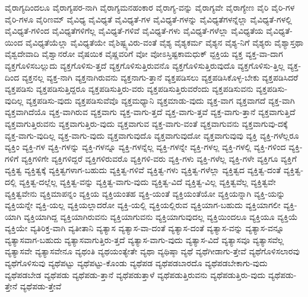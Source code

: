{ವೈರಾಗ್ಯದಿಂದಲೂ
ವೈರಾಗ್ಯಪರ-ನಾಗಿ
ವೈರಾಗ್ಯಮನಹಂಕಾರ
ವೈರಾಗ್ಯ-ವನ್ನು
ವೈರಾಗ್ಯವೇ
ವೈರಾಗ್ಯೇಣ
ವೈರಿ
ವೈರಿ-ಗಳ
ವೈರಿ-ಗಳೂ
ವೈರಿಣಮ್
ವೈವಿಧ್ಯ
ವೈವಿಧ್ಯತೆ
ವೈವಿಧ್ಯತೆ-ಗಳ
ವೈವಿಧ್ಯತೆ-ಗಳನ್ನು
ವೈವಿಧ್ಯತೆಗಳನ್ನೆಲ್ಲಾ
ವೈವಿಧ್ಯತೆ-ಗಳಲ್ಲಿ
ವೈವಿಧ್ಯತೆ-ಗಳಿಂದ
ವೈವಿಧ್ಯತೆಗಳಿಗೆಲ್ಲ
ವೈವಿಧ್ಯತೆ-ಗಳಿವೆ
ವೈವಿಧ್ಯತೆ-ಗಳು
ವೈವಿಧ್ಯತೆ-ಗಳೆಲ್ಲಾ
ವೈವಿಧ್ಯತೆಯ
ವೈವಿಧ್ಯತೆ-ಯಿಂದ
ವೈವಿಧ್ಯತೆಯೆಲ್ಲಾ
ವೈವಿಧ್ಯತೆಯೇ
ವೈಶಿಷ್ಟ್ಯವಿರು-ವಂತೆ
ವೈಶ್ಯ
ವೈಶ್ಯಕರ್ಮ
ವೈಶ್ಯನ
ವೈಶ್ಯ-ನಿಗೆ
ವೈಶ್ಯರು
ವೈಶ್ಯಾಸ್ತಥಾ
ವೈಶ್ವದೇವಾದಿ
ವೈಶ್ವಾನರೋ
ವೈಷಯಿಕ
ವೈಷ್ಣವರಿಗೆ
ವೋ
ವೋಽಸ್ತಿಷ್ಟಕಾಮಧುಕ್
ವ್ಟಕ್ತಿಯ
ವ್ಯಕ್ತ
ವ್ಯಕ್ತ-ವಾ-ದಾಗ
ವ್ಯಕ್ತಗೊಳಿಸಬಲ್ಲುದು
ವ್ಯಕ್ತಗೊಳಿಸು-ತ್ತದೆ
ವ್ಯಕ್ತಗೊಳಿಸುತ್ತಿರುವನೊ
ವ್ಯಕ್ತಗೊಳಿಸುತ್ತಿರುವುದೊ
ವ್ಯಕ್ತಗೊಳಿಸು-ತ್ತಿಲ್ಲ
ವ್ಯಕ್ತ-ದಿಂದ
ವ್ಯಕ್ತನಲ್ಲ
ವ್ಯಕ್ತ-ನಾಗಿ
ವ್ಯಕ್ತನಾಗಿರುವನು
ವ್ಯಕ್ತನಾಗು-ತ್ತಾನೆ
ವ್ಯಕ್ತಪಡಿಸಲು
ವ್ಯಕ್ತಪಡಿಸಿಕೊಳ್ಳ-ಬೇಕು
ವ್ಯಕ್ತಪಡಿಸಿದರೆ
ವ್ಯಕ್ತಪಡಿಸು
ವ್ಯಕ್ತಪಡಿಸುತ್ತಿದ್ದರೂ
ವ್ಯಕ್ತಪಡಿಸುತ್ತಿರು-ವರು
ವ್ಯಕ್ತಪಡಿಸುತ್ತಿರುವರೆಂದು
ವ್ಯಕ್ತಪಡಿಸುವನು
ವ್ಯಕ್ತಪಡಿಸು-ವುದಿಲ್ಲ
ವ್ಯಕ್ತಪಡಿಸು-ವುದು
ವ್ಯಕ್ತಪಡಿಸುವೆವೊ
ವ್ಯಕ್ತಮಧ್ಯಾನಿ
ವ್ಯಕ್ತಮಾಡು-ವುದು
ವ್ಯಕ್ತ-ವಾಗ
ವ್ಯಕ್ತವಾಗದೆ
ವ್ಯಕ್ತ-ವಾಗಿ
ವ್ಯಕ್ತವಾಗಿದೆಯೊ
ವ್ಯಕ್ತ-ವಾಗಿರುವ
ವ್ಯಕ್ತವಾಗು
ವ್ಯಕ್ತ-ವಾಗು-ತ್ತದೆ
ವ್ಯಕ್ತ-ವಾಗು-ತ್ತವೆ
ವ್ಯಕ್ತ-ವಾಗು-ತ್ತಾನೆ
ವ್ಯಕ್ತವಾಗುತ್ತಿದೆ
ವ್ಯಕ್ತವಾಗುತ್ತಿರುವನು
ವ್ಯಕ್ತವಾಗುತ್ತಿರು-ವುದು
ವ್ಯಕ್ತವಾಗುವ
ವ್ಯಕ್ತ-ವಾಗು-ವಂತೆ
ವ್ಯಕ್ತವಾಗುವನು
ವ್ಯಕ್ತವಾಗುವು-ದಕ್ಕೆ
ವ್ಯಕ್ತ-ವಾಗು-ವುದಿಲ್ಲ
ವ್ಯಕ್ತ-ವಾಗು-ವುದು
ವ್ಯಕ್ತವಾಗುವುದೊ
ವ್ಯಕ್ತವಾಗುವುದೋ
ವ್ಯಕ್ತವಾಗುವುವು
ವ್ಯಕ್ತಿ
ವ್ಯಕ್ತಿ-ಗಳೆಲ್ಲರೂ
ವ್ಯಕ್ತಿಂ
ವ್ಯಕ್ತಿ-ಗಳ
ವ್ಯಕ್ತಿ-ಗಳನ್ನು
ವ್ಯಕ್ತಿ-ಗಳನ್ನೂ
ವ್ಯಕ್ತಿ-ಗಳನ್ನೆಲ್ಲ
ವ್ಯಕ್ತಿ-ಗಳನ್ನೇ
ವ್ಯಕ್ತಿ-ಗಳಲ್ಲ
ವ್ಯಕ್ತಿ-ಗಳಲ್ಲಿ
ವ್ಯಕ್ತಿ-ಗಳಿಂದ
ವ್ಯಕ್ತಿ-ಗಳಿಗೆ
ವ್ಯಕ್ತಿಗಳಿಗೇ
ವ್ಯಕ್ತಿಗಳಿದ್ದರೆ
ವ್ಯಕ್ತಿಗಳಿರುವರೊ
ವ್ಯಕ್ತಿಗಳಿ-ವರು
ವ್ಯಕ್ತಿ-ಗಳು
ವ್ಯಕ್ತಿ-ಗಳೆಲ್ಲ
ವ್ಯಕ್ತಿ-ಗಳೇ
ವ್ಯಕ್ತಿಗೂ
ವ್ಯಕ್ತಿಗೆ
ವ್ಯಕ್ತಿತ್ವ
ವ್ಯಕ್ತಿತ್ವಕ್ಕೆ
ವ್ಯಕ್ತಿತ್ವಗಳಾಗ-ಬಹುದು
ವ್ಯಕ್ತಿತ್ವ-ಗಳಿವೆ
ವ್ಯಕ್ತಿತ್ವ-ಗಳು
ವ್ಯಕ್ತಿತ್ವ-ಗಳೆಲ್ಲಾ
ವ್ಯಕ್ತಿತ್ವದ
ವ್ಯಕ್ತಿತ್ವ-ದಂತೆ
ವ್ಯಕ್ತಿತ್ವ-ದಲ್ಲಿ
ವ್ಯಕ್ತಿತ್ವ-ದಲ್ಲೆಲ್ಲ
ವ್ಯಕ್ತಿತ್ವ-ವನ್ನು
ವ್ಯಕ್ತಿತ್ವ-ವಾಗು-ವುದು
ವ್ಯಕ್ತಿತ್ವ-ವಿದೆ
ವ್ಯಕ್ತಿತ್ವ-ವಿಲ್ಲ
ವ್ಯಕ್ತಿತ್ವವೆಲ್ಲ
ವ್ಯಕ್ತಿತ್ವವೇ
ವ್ಯಕ್ತಿತ್ವವೇನು
ವ್ಯಕ್ತಿಮಾಪನ್ನಂ
ವ್ಯಕ್ತಿಯ
ವ್ಯಕ್ತಿಯಂತಹ
ವ್ಯಕ್ತಿ-ಯಂತೆ
ವ್ಯಕ್ತಿಯಂತೆಯೋ
ವ್ಯಕ್ತಿಯನ್ನಾಗಿ
ವ್ಯಕ್ತಿ-ಯನ್ನು
ವ್ಯಕ್ತಿಯನ್ನೇ
ವ್ಯಕ್ತಿ-ಯಲ್ಲ
ವ್ಯಕ್ತಿಯಲ್ಲಾದರೋ
ವ್ಯಕ್ತಿ-ಯಲ್ಲಿ
ವ್ಯಕ್ತಿಯಲ್ಲಿರುವ
ವ್ಯಕ್ತಿಯಾಗ-ಬಹುದು
ವ್ಯಕ್ತಿಯಾಗಲೀ
ವ್ಯಕ್ತಿ-ಯಾಗಿ
ವ್ಯಕ್ತಿಯಾಗಿದ್ದ
ವ್ಯಕ್ತಿಯಾಗಿರುವನು
ವ್ಯಕ್ತಿಯಾಗುವನು
ವ್ಯಕ್ತಿಯಾಗುವುದಲ್ಲ
ವ್ಯಕ್ತಿಯಿಂದಲೂ
ವ್ಯಕ್ತಿಯೂ
ವ್ಯಕ್ತಿಯೆ
ವ್ಯಕ್ತಿಯೇ
ವ್ಯತಿರಿಕ್ತ-ವಾಗಿ
ವ್ಯತೀತಾನಿ
ವ್ಯತ್ಯಾಸ
ವ್ಯತ್ಯಾಸ-ವಾ-ದಂತೆ
ವ್ಯತ್ಯಾಸ-ದಂತೆ
ವ್ಯತ್ಯಾಸ-ವನ್ನು
ವ್ಯತ್ಯಾಸ-ವನ್ನೂ
ವ್ಯತ್ಯಾಸವಾಗ-ಬಹುದು
ವ್ಯತ್ಯಾಸವಾಗುತ್ತಿರು-ತ್ತದೆ
ವ್ಯತ್ಯಾಸ-ವಾಗು-ವುದು
ವ್ಯತ್ಯಾಸ-ವಿದೆ
ವ್ಯತ್ಯಾಸವೂ
ವ್ಯತ್ಯಾಸವೆಲ್ಲ
ವ್ಯತ್ಯಾಸವೇ
ವ್ಯತ್ಯಾಸವೇನೂ
ವ್ಯಥಂತಿ
ವ್ಯಥಯಂತ್ಯೇತೇ
ವ್ಯಥಾ
ವ್ಯಥಿಷ್ಠಾ
ವ್ಯಥೆ
ವ್ಯಥೆಗೀಡಾಗು-ತ್ತೇವೆ
ವ್ಯಥೆಗೊಳಿಸಲಾರವು
ವ್ಯಥೆಗೊಳಿಸುವು
ವ್ಯಥೆಪಟ್ಟು
ವ್ಯಥೆಪಟ್ಟು-ಕೊಂಡು
ವ್ಯಥೆಪಡ
ವ್ಯಥೆಪಡಬಾರದೊ
ವ್ಯಥೆಪಡಬೇಕಾಗು-ವುದು
ವ್ಯಥೆಪಡಬೇಡ
ವ್ಯಥೆಪಡು
ವ್ಯಥೆಪಡು-ತ್ತಾನೆ
ವ್ಯಥೆಪಡುತ್ತಾಳೆ
ವ್ಯಥೆಪಡುತ್ತಿರುವನು
ವ್ಯಥೆಪಡುತ್ತಿರು-ವುದು
ವ್ಯಥೆಪಡು-ತ್ತೇನೆ
ವ್ಯಥೆಪಡು-ತ್ತೇವೆ
}
